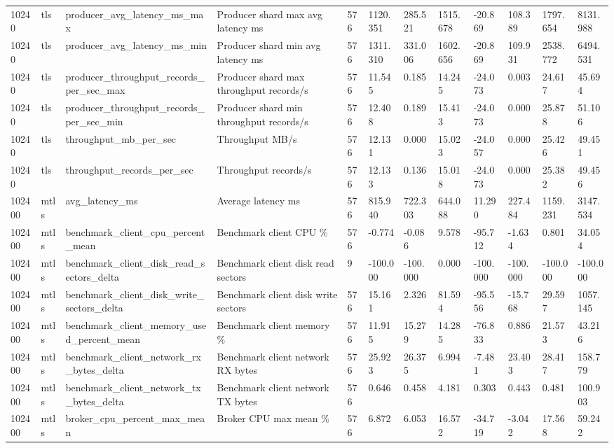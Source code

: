 \begin{longtable}{llllllllllll}
10240 & tls & producer\_avg\_latency\_ms\_max & Producer shard max avg latency ms & 576 & 1120.351 & 285.521 & 1515.678 & -20.869 & 108.389 & 1797.654 & 8131.988 \\
10240 & tls & producer\_avg\_latency\_ms\_min & Producer shard min avg latency ms & 576 & 1311.310 & 331.006 & 1602.656 & -20.869 & 109.931 & 2538.772 & 6494.531 \\
10240 & tls & producer\_throughput\_records\_per\_sec\_max & Producer shard max throughput records/s & 576 & 11.545 & 0.185 & 14.245 & -24.073 & 0.003 & 24.617 & 45.694 \\
10240 & tls & producer\_throughput\_records\_per\_sec\_min & Producer shard min throughput records/s & 576 & 12.408 & 0.189 & 15.413 & -24.073 & 0.000 & 25.878 & 51.106 \\
10240 & tls & throughput\_mb\_per\_sec & Throughput MB/s & 576 & 12.131 & 0.000 & 15.023 & -24.057 & 0.000 & 25.426 & 49.451 \\
10240 & tls & throughput\_records\_per\_sec & Throughput records/s & 576 & 12.133 & 0.136 & 15.018 & -24.073 & 0.000 & 25.382 & 49.456 \\
102400 & mtls & avg\_latency\_ms & Average latency ms & 576 & 815.940 & 722.303 & 644.088 & 11.290 & 227.484 & 1159.231 & 3147.534 \\
102400 & mtls & benchmark\_client\_cpu\_percent\_mean & Benchmark client CPU \% & 576 & -0.774 & -0.086 & 9.578 & -95.712 & -1.634 & 0.801 & 34.054 \\
102400 & mtls & benchmark\_client\_disk\_read\_sectors\_delta & Benchmark client disk read sectors & 9 & -100.000 & -100.000 & 0.000 & -100.000 & -100.000 & -100.000 & -100.000 \\
102400 & mtls & benchmark\_client\_disk\_write\_sectors\_delta & Benchmark client disk write sectors & 576 & 15.161 & 2.326 & 81.594 & -95.556 & -15.768 & 29.597 & 1057.145 \\
102400 & mtls & benchmark\_client\_memory\_used\_percent\_mean & Benchmark client memory \% & 576 & 11.915 & 15.279 & 14.285 & -76.833 & 0.886 & 21.573 & 43.216 \\
102400 & mtls & benchmark\_client\_network\_rx\_bytes\_delta & Benchmark client network RX bytes & 576 & 25.923 & 26.375 & 6.994 & -7.481 & 23.403 & 28.417 & 158.779 \\
102400 & mtls & benchmark\_client\_network\_tx\_bytes\_delta & Benchmark client network TX bytes & 576 & 0.646 & 0.458 & 4.181 & 0.303 & 0.443 & 0.481 & 100.903 \\
102400 & mtls & broker\_cpu\_percent\_max\_mean & Broker CPU max mean \% & 576 & 6.872 & 6.053 & 16.572 & -34.719 & -3.042 & 17.568 & 59.242 \\

\end{longtable}
